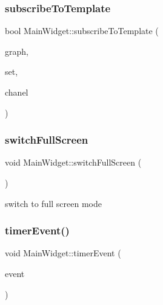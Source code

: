 \hypertarget{class_main_widget_adf1350b871ca05e3c3af8306d7e07acf}{}\label{class_main_widget_adf1350b871ca05e3c3af8306d7e07acf} 
\subsubsection{\texorpdfstring{subscribe\+To\+Template}{subscribeToTemplate}}
{\footnotesize\ttfamily bool Main\+Widget\+::subscribe\+To\+Template (\begin{DoxyParamCaption}\item[{\hyperlink{class_graph}{Graph} $\ast$}]{graph,  }\item[{Q\+X\+Y\+Series $\ast$}]{set,  }\item[{int}]{chanel }\end{DoxyParamCaption})\hspace{0.3cm}{\ttfamily [slot]}}

\hypertarget{class_main_widget_a798a61a3c09fbb3763f93c8aa7ea8a77}{}\label{class_main_widget_a798a61a3c09fbb3763f93c8aa7ea8a77} 
\subsubsection{\texorpdfstring{switch\+Full\+Screen}{switchFullScreen}}
{\footnotesize\ttfamily void Main\+Widget\+::switch\+Full\+Screen (\begin{DoxyParamCaption}{ }\end{DoxyParamCaption})\hspace{0.3cm}{\ttfamily [slot]}}



switch to full screen mode 

\hypertarget{class_main_widget_a2e776dc0a11cab27730e7b9721701a17}{}\label{class_main_widget_a2e776dc0a11cab27730e7b9721701a17} 
\subsubsection{\texorpdfstring{timer\+Event()}{timerEvent()}}
{\footnotesize\ttfamily void Main\+Widget\+::timer\+Event (\begin{DoxyParamCaption}\item[{Q\+Timer\+Event $\ast$}]{event }\end{DoxyParamCaption})}

